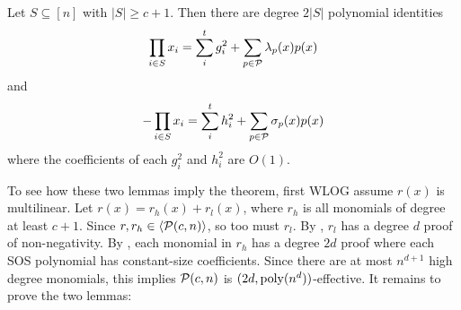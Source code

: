 \begin{lemma}\label{lem:highdeg}
Let $S \subseteq [n]$ with $|S| \geq c+1$. Then there are degree $2|S|$ polynomial identities
\[\prod_{i \in S} x_i = \sum_{i}^{t} g_i^2 + \sum_{p \in \mathcal P} \lambda_p(x) p(x)\]
and
\[-\prod_{i \in S} x_i = \sum_{i}^{t} h_i^2 + \sum_{p \in \mathcal P} \sigma_p(x) p(x)\]
where the coefficients of each $g_i^2$ and $h_i^2$ are $O(1)$. 
\end{lemma}
To see how these two lemmas imply the theorem, first WLOG assume $r(x)$ is multilinear. Let $r(x) = r_h(x) + r_l(x)$, where $r_h$ is all monomials of degree at least $c+1$. Since $r,r_h \in \langle \mathcal P(c,n)\rangle$, so too must $r_l$. By , $r_l$ has a degree $d$ proof of non-negativity. By , each monomial in $r_h$ has a degree $2d$ proof where each SOS polynomial has constant-size coefficients. Since there are at most $n^{d+1}$ high degree monomials, this implies $\mathcal P(c,n)$ is $(2d, \operatorname{poly}(n^d))$-effective. It remains to prove the two lemmas:

